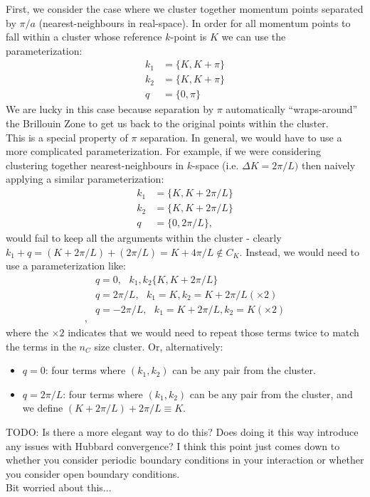\documentclass[12pt]{article}
\numberwithin{equation}{section}
\begin{document}
First, we consider the case where we cluster together momentum points separated by $\pi/a$ (nearest-neighbours in real-space).
In order for all momentum points to fall within a cluster whose reference $k$-point is $K$ we can use the parameterization:
\begin{align}
    k_1&=\{K,K+\pi\}\\
    k_2&=\{K,K+\pi\}\\
    q&=\{0,\pi\}
\end{align}
We are lucky in this case because separation by $\pi$ automatically ``wraps-around'' the Brillouin Zone to get us back to the original points within the cluster. \\

This is a special property of $\pi$ separation. In general, we would have to use a more complicated parameterization. For example, if we were considering clustering together nearest-neighbours in $k$-space (i.e. $\Delta K=2\pi/L)$ then naively applying a similar parameterization:
\begin{align}
    k_1&=\{K,K+2\pi/L\}\\
    k_2&=\{K,K+2\pi/L\}\\
    q&=\{0,2\pi/L\},
\end{align}
would fail to keep all the arguments within the cluster - clearly $k_1+q=(K+2\pi/L)+(2\pi/L)=K+4\pi/L\not\in C_K$. Instead, we would need to use a parameterization like:
\begin{align}
    &q=0,\text{  }k_1,k_2\{K,K+2\pi/L\}\\
    &q=2\pi/L, \text{  } k_1=K, k_2=K+2\pi/L (\times 2)\\
    &q=-2\pi/L, \text{  } k_1=K+2\pi/L, k_2=K (\times 2)\\,
\end{align}
where the $\times 2$ indicates that we would need to repeat those terms twice to match the terms in the $n_C$ size cluster. Or, alternatively:
\begin{itemize}
    \item $q=0$: four terms where $(k_1, k_2)$ can be any pair from the cluster.
    \item $q=2\pi/L$: four terms where $(k_1,k_2)$ can be any pair from the cluster, and we define $(K+2\pi/L)+2\pi/L \equiv K$.
\end{itemize}

\begin{tcolorbox}
    TODO: Is there a more elegant way to do this? Does doing it this way introduce any issues with Hubbard convergence? I think this point just comes down to whether you consider periodic boundary conditions in your interaction or whether you consider open boundary conditions.\\

    Bit worried about this...
\end{tcolorbox}
\end{document}
